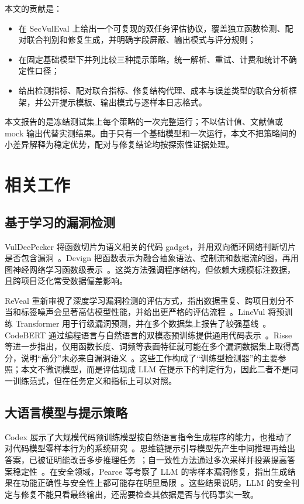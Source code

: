 \documentclass[conference]{IEEEtran}
\begin{document}
本文的贡献是：
\begin{itemize}
    \item 在 SecVulEval 上给出一个可复现的双任务评估协议，覆盖独立函数检测、配对联合判别和修复生成，并明确字段屏蔽、输出模式与评分规则；
    \item 在固定基础模型下并列比较三种提示策略，统一解析、重试、计费和统计不确定性口径；
    \item 给出检测指标、配对联合指标、修复结构代理、成本与误差类型的联合分析框架，并公开提示模板、输出模式与逐样本日志格式。
\end{itemize}

本文报告的是冻结测试集上每个策略的一次完整运行；不以估计值、文献值或 mock 输出代替实测结果。由于只有一个基础模型和一次运行，本文不把策略间的小差异解释为稳定优势，配对与修复结论均按探索性证据处理。

\section{相关工作}
\label{sec:related}

\subsection{基于学习的漏洞检测}
VulDeePecker 将函数切片为语义相关的代码 gadget，并用双向循环网络判断切片是否包含漏洞~\cite{li2018vuldeepecker}。Devign 把函数表示为融合抽象语法、控制流和数据流的图，再用图神经网络学习函数级表示~\cite{zhou2019devign}。这类方法强调程序结构，但依赖大规模标注数据，且跨项目泛化常受数据偏差影响。

ReVeal 重新审视了深度学习漏洞检测的评估方式，指出数据重复、跨项目划分不当和标签噪声会显著高估模型性能，并给出更严格的评估流程~\cite{chakraborty2021reveal}。LineVul 将预训练 Transformer 用于行级漏洞预测，并在多个数据集上报告了较强基线~\cite{fu2022linevul}。CodeBERT 通过编程语言与自然语言的双模态预训练提供通用代码表示~\cite{feng2020codebert}。Risse 等进一步指出，仅用函数长度、词频等表面特征就可能在多个漏洞数据集上取得高分，说明“高分”未必来自漏洞语义~\cite{risse2024limits,risse2025topscore}。这些工作构成了“训练型检测器”的主要参照；本文不微调模型，而是评估现成 LLM 在提示下的判定行为，因此二者不是同一训练范式，但在任务定义和指标上可以对照。

\subsection{大语言模型与提示策略}
Codex 展示了大规模代码预训练模型按自然语言指令生成程序的能力，也推动了对代码模型零样本行为的系统研究~\cite{chen2021codex}。思维链提示引导模型先产生中间推理再给出答案，已被证明能改善多步推理任务~\cite{wei2022cot}；自一致性方法通过多次采样并投票提高答案稳定性~\cite{wang2023selfconsistency}。在安全领域，Pearce 等考察了 LLM 的零样本漏洞修复，指出生成结果在功能正确性与安全性上都可能存在明显局限~\cite{pearce2023zeroshot}。这些结果说明，LLM 的安全判定与修复不能只看最终输出，还需要检查其依据是否与代码事实一致。
\end{document}

